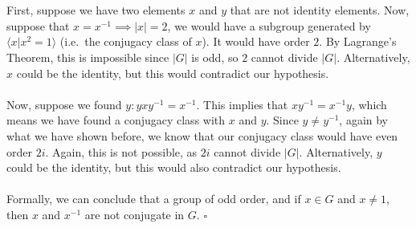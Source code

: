 \documentclass[letterpaper]{article}
\newcommand*{\QED}{\hfill\ensuremath{\square}}%
\begin{document}
\section{}
\label{sec:Question3}
First, suppose we have two elements $ x $ and $ y $ that are not identity elements.
Now, suppose that $ x = x^{-1} \implies |x| = 2 $, we would have a subgroup generated by $ \langle x | x^2 = 1 \rangle $ (i.e.\ the conjugacy class of $ x $).
It would have order $ 2 $.
By Lagrange's Theorem, this is impossible since $ |G| $ is odd, so $ 2 $ cannot divide $ |G| $.
Alternatively, $ x $ could be the identity, but this would contradict our hypothesis.
\\ \\
Now, suppose we found $ y : yxy^{-1} = x^{-1} $.
This implies that $ xy^{-1} = x^{-1} y $, which means we have found a conjugacy class with $ x $ and $ y $.
Since $ y \neq y^{-1} $, again by what we have shown before, we know that our conjugacy class would have even order $ 2i $.
Again, this is not possible, as $ 2i $ cannot divide $ |G| $.
Alternatively, $ y $ could be the identity, but this would also contradict our hypothesis.
\\ \\
Formally, we can conclude that a group of odd order, and if $ x \in G $ and $ x \neq 1 $, then $ x $ and $ x^{-1} $ are not conjugate in $ G $.
\QED{}

\section{}
\label{sec:Question4}
\end{document}
